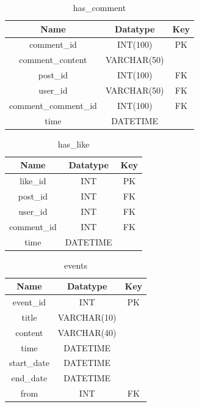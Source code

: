 \begin{table}[!ht]
\caption{has\_comment}
\centering
\begin{tabular}{c c c}
\hline\hline
Name                 & Datatype     & Key \\
\hline
comment\_id          & INT(100)     & PK  \\
comment\_content     & VARCHAR(50)  &     \\
post\_id             & INT(100)     & FK  \\
user\_id             & VARCHAR(50)  & FK  \\
comment\_comment\_id & INT(100)     & FK   \\
time                 & DATETIME     &     \\
\hline
\end{tabular}
\label{table:nonlin}
\end{table}

\begin{table}[!ht]
\caption{has\_like}
\centering
\begin{tabular}{c c c}
\hline\hline
Name               & Datatype    & Key \\
\hline
like\_id           & INT          & PK  \\
post\_id           & INT          & FK  \\
user\_id           & INT          & FK  \\
comment\_id        & INT          & FK  \\
time               & DATETIME     &     \\
\hline
\end{tabular}
\label{table:nonlin}
\end{table}

\begin{table}[!ht]
\caption{events}
\centering
\begin{tabular}{c c c}
\hline\hline
Name                    & Datatype    & Key \\
\hline
event\_id               & INT          & PK  \\
title                   & VARCHAR(10)  &     \\
content                 & VARCHAR(40)  &     \\
time                    & DATETIME     & \\
start\_date             & DATETIME     & \\
end\_date               & DATETIME     & \\
from                    & INT          & FK  \\
\hline
\end{tabular}
\label{table:nonlin}
\end{table}

